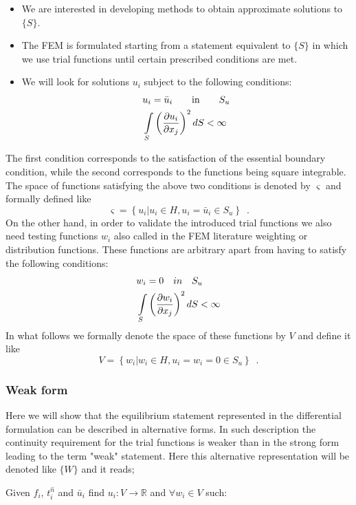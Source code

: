 \begin{itemize}
\item We are interested in developing methods to obtain approximate solutions to $\{S\}$.
\item The FEM is formulated starting from a statement equivalent to $\{ S \}$ in which we use trial functions until certain prescribed conditions are met.
\item We will look for solutions $u_i$ subject to the following conditions:
\begin{align*}
&u_i = \bar u_i \qquad \text{in} \qquad S_u\\
&\int\limits_S \left(\pdv{u_i}{x_j} \right)^2 dS < \infty
\end{align*}

\end{itemize}

The first condition corresponds to the satisfaction of the essential boundary condition, while the second corresponds to the functions being square integrable. The space of functions satisfying the above two conditions is denoted by $\varsigma$ and formally defined like
%
\[\varsigma = \left\{u_i\left| {u_i} \in H, {u_i} = \bar{u}_i \in S_u \right. \right\} \enspace .\]
%
On the other hand, in order to validate the introduced trial functions we also need testing functions $w_i$ also called in the FEM literature weighting or distribution functions. These functions are arbitrary apart from having to satisfy the following conditions:
%
\begin{align*}
&w_i = 0 \quad in \quad {S_u}\\
&\int\limits_S \left(\pdv{w_i}{x_j}\right)^2 dS < \infty
\end{align*}
%
In what follows we formally denote the space of these functions by $V$ and define it like
%
\[V = \left\{ w_i\left| w_i \in H, u_i = w_i=0 \in S_u \right. \right\} \enspace .\]

\subsubsection{Weak form}
Here we will show that the equilibrium statement represented in the differential formulation can be described in alternative forms. In such description the continuity requirement for the trial functions is weaker than in the strong form leading to the term "weak" statement. Here this alternative representation will be denoted like $\{W\}$ and it reads;

Given $f_i$, $t_i^{\hat n}$ and ${\bar u_i}$ find ${u_i}:V \to \mathbb{R}$ and $\forall {w_i} \in V$ such:


